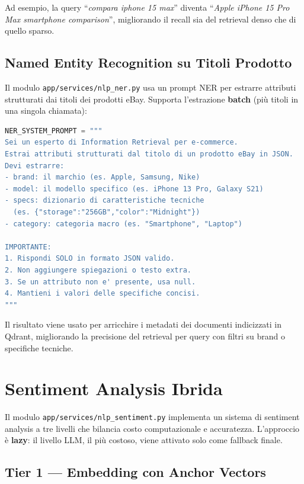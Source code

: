 Ad esempio, la query ``\emph{compara iphone 15 max}'' diventa
``\emph{Apple iPhone 15 Pro Max smartphone comparison}'', migliorando
il recall sia del retrieval denso che di quello sparso.

\subsection{Named Entity Recognition su Titoli Prodotto}
\label{subsec:ner}

Il modulo \texttt{app/services/nlp\_ner.py} usa un prompt NER per
estrarre attributi strutturati dai titoli dei prodotti eBay. Supporta
l'estrazione \textbf{batch} (più titoli in una singola chiamata):

\begin{lstlisting}[language=Python,caption={NER\_SYSTEM\_PROMPT (app/services/nlp\_ner.py)},label=lst:ner-prompt]
NER_SYSTEM_PROMPT = """
Sei un esperto di Information Retrieval per e-commerce.
Estrai attributi strutturati dal titolo di un prodotto eBay in JSON.
Devi estrarre:
- brand: il marchio (es. Apple, Samsung, Nike)
- model: il modello specifico (es. iPhone 13 Pro, Galaxy S21)
- specs: dizionario di caratteristiche tecniche
  (es. {"storage":"256GB","color":"Midnight"})
- category: categoria macro (es. "Smartphone", "Laptop")

IMPORTANTE:
1. Rispondi SOLO in formato JSON valido.
2. Non aggiungere spiegazioni o testo extra.
3. Se un attributo non e' presente, usa null.
4. Mantieni i valori delle specifiche concisi.
"""
\end{lstlisting}

Il risultato viene usato per arricchire i metadati dei documenti indicizzati
in Qdrant, migliorando la precisione del retrieval per query con filtri
su brand o specifiche tecniche.


\section{Sentiment Analysis Ibrida}
\label{sec:sentiment-hybrid}

Il modulo \texttt{app/services/nlp\_sentiment.py} implementa un sistema
di sentiment analysis a tre livelli che bilancia costo computazionale e
accuratezza. L'approccio è \textbf{lazy}: il livello LLM, il più costoso,
viene attivato solo come fallback finale.

\subsection{Tier 1 — Embedding con Anchor Vectors}
\label{subsec:sentiment-tier1}

